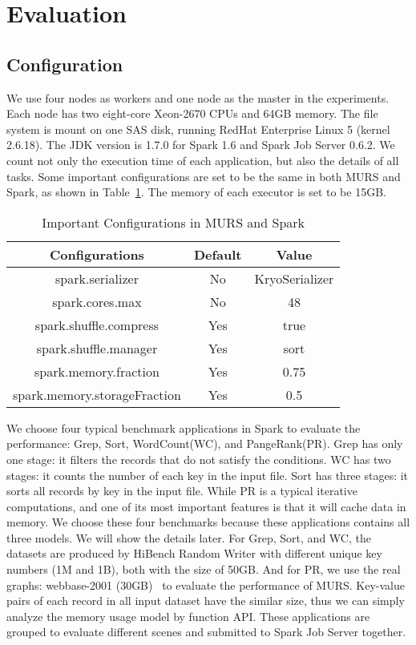 \section{Evaluation}

\subsection{Configuration}

We use four nodes as workers and one node as the master in the experiments. Each node has two eight-core Xeon-2670 CPUs and 64GB memory. The file system is mount on one SAS disk, running RedHat Enterprise Linux 5 (kernel 2.6.18). The JDK version is 1.7.0 for Spark 1.6 and Spark Job Server 0.6.2. We count not only the execution time of each application, but also the details of all tasks. Some important configurations are set to be the same in both MURS and Spark, as shown in Table~\ref{table:config}. The memory of each executor is set to be 15GB.

\begin{table}[!t]
\small
\centering
\caption{Important Configurations in MURS and Spark}
\begin{tabular}{ c | c | c }

\hline
\textbf{Configurations} & \textbf{Default} & \textbf{Value} \\
\hline
spark.serializer & No & KryoSerializer \\
\hline
spark.cores.max & No & 48 \\
\hline
spark.shuffle.compress & Yes & true \\
\hline
spark.shuffle.manager & Yes & sort \\
\hline
spark.memory.fraction & Yes & 0.75 \\
\hline
spark.memory.storageFraction & Yes & 0.5 \\
\hline

\hline
\end{tabular}
\label{table:config}
\end{table} 

We choose four typical benchmark applications in Spark to evaluate the performance: Grep, Sort, WordCount(WC), and PangeRank(PR). Grep has only one stage: it filters the records that do not satisfy the conditions. WC has two stages: it counts the number of each key in the input file.  Sort has three stages: it sorts all records by key in the input file. While PR is a typical iterative computations, and one of its most important features is that it will cache data in memory. We choose these four benchmarks because these applications contains all three models. We will show the details later. For Grep, Sort, and WC, the datasets are produced by HiBench Random Writer with different unique key numbers (1M and 1B), both with the size of 50GB. And for PR, we use the real graphs: webbase-2001 (30GB)~\cite{boldi:webgraph} to evaluate the performance of MURS. Key-value pairs of each record in all input dataset have the similar size, thus we can simply analyze the memory usage model by function API. These applications are grouped to evaluate different scenes and submitted to Spark Job Server together.

